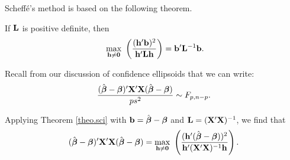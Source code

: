 %

Scheff\'e's method is based on the following theorem.

\btheo
\label{theo.sci}
If $\mathbf{L}$ is positive definite, then 
$$\ \max_{\bfh\neq\zero}\ 
\left( {(\bfh'\bfb)^2\over\bfh'\bfL\bfh} \right) = \bfb'\bfL^{-1}\bfb.$$
\estheo


\vb
Recall from our discussion of confidence ellipsoids that we can write:
\begin{eqnarray*}
\frac{(\hat {\mbox{\boldmath $\beta$}} - \mbox{\boldmath $\beta$})'  \mathbf{X}' \mathbf{X} (\hat {\mbox{\boldmath $\beta$}} - \mbox{\boldmath $\beta$})}{ps^2} \sim F_{p,n-p}.
\end{eqnarray*}

Applying Theorem \ref{theo.sci} with $\mathbf{b} = \hat {\mbox{\boldmath $\beta$}} - \mbox{\boldmath $\beta$}$ and $\mathbf{L} = (\mathbf{X}' \mathbf{X})^{-1}$, we find that
\begin{eqnarray*}
(\hat \bfbet - \bfbet)'  \bfX' \bfX (\hat \bfbet - \bfbet) = \max_{\bfh\neq\zero}\ 
\left( {(\bfh'(\hat \bfbet - \bfbet))^2\over\bfh' (\bfX' \bfX)^{-1}\bfh} \right).
\end{eqnarray*}


